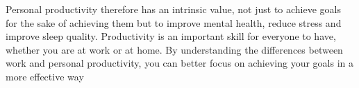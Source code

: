 Personal productivity therefore has an intrinsic value, not just to achieve goals for the sake of achieving them but to improve mental health, reduce stress and improve sleep quality.
Productivity is an important skill for everyone to have, whether you are at work or at home. By understanding the differences between work and personal productivity, you can better focus on achieving your goals in a more effective way
%



